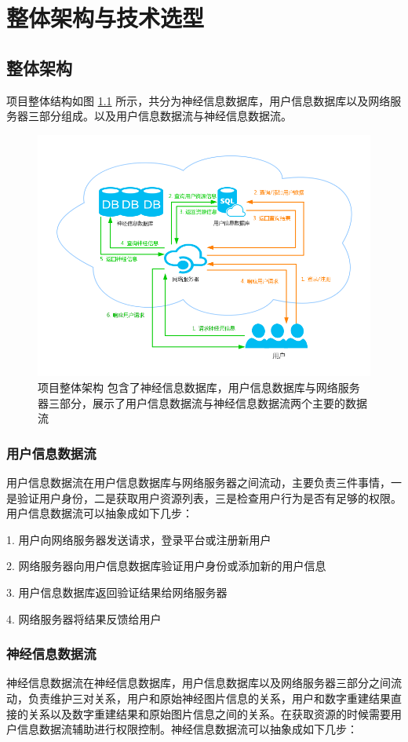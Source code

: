 \chapter{整体架构与技术选型}

\section{整体架构}
项目整体结构如图 \ref{server} 所示，共分为神经信息数据库，用户信息数据库以及网络服务器三部分组成。以及用户信息数据流与神经信息数据流。

\begin{figure}[!ht]
\centering
\includegraphics[width=128mm]{images/server}
\caption{项目整体架构 包含了神经信息数据库，用户信息数据库与网络服务器三部分，展示了用户信息数据流与神经信息数据流两个主要的数据流}
\label{server}
\end{figure}

\subsection{用户信息数据流}
用户信息数据流在用户信息数据库与网络服务器之间流动，主要负责三件事情，一是验证用户身份，二是获取用户资源列表，三是检查用户行为是否有足够的权限。用户信息数据流可以抽象成如下几步：

1. 用户向网络服务器发送请求，登录平台或注册新用户

2. 网络服务器向用户信息数据库验证用户身份或添加新的用户信息

3. 用户信息数据库返回验证结果给网络服务器

4. 网络服务器将结果反馈给用户

\subsection{神经信息数据流}
神经信息数据流在神经信息数据库，用户信息数据库以及网络服务器三部分之间流动，负责维护三对关系，用户和原始神经图片信息的关系，用户和数字重建结果直接的关系以及数字重建结果和原始图片信息之间的关系。在获取资源的时候需要用户信息数据流辅助进行权限控制。神经信息数据流可以抽象成如下几步：

